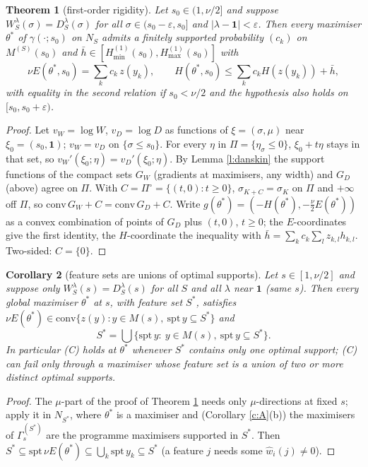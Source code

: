 \documentclass[11pt]{article}
\newtheorem{theorem}{Theorem}\newtheorem{lemma}[theorem]{Lemma}\newtheorem{proposition}[theorem]{Proposition}
\newtheorem{corollary}[theorem]{Corollary}
\theoremstyle{remark}\newtheorem{remark}[theorem]{Remark}
\begin{document}
\begin{theorem}[first-order rigidity]\label{t:B}
Let $s_0\in(1,\nu/2]$ and suppose $W^\lambda_S(\sigma)=D^\lambda_S(\sigma)$ for all $\sigma\in(s_0-\varepsilon,s_0]$ and
$|\lambda-\mathbf1|<\varepsilon$. Then every maximiser $\theta^*$ of $\gamma(\cdot;s_0)$ on $N_S$ admits a finitely supported
probability $(c_k)$ on $M^{(S)}(s_0)$ and $\bar h\in[H^{(1)}_{\min}(s_0),H^{(1)}_{\max}(s_0)]$ with
\[\nu E(\theta^*,s_0)=\sum_kc_k\,z(y_k),\qquad H(\theta^*,s_0)\le\sum_kc_kH(z(y_k))+\bar h ,\]
with equality in the second relation if $s_0<\nu/2$ and the hypothesis also holds on $[s_0,s_0+\varepsilon)$.
\end{theorem}
\begin{proof}
Let $v_W=\log W$, $v_D=\log D$ as functions of $\xi=(\sigma,\mu)$ near $\xi_0=(s_0,\mathbf1)$; $v_W=v_D$ on $\{\sigma\le s_0\}$.
For every $\eta$ in $\Pi=\{\eta_\sigma\le0\}$, $\xi_0+t\eta$ stays in that set, so $v_W'(\xi_0;\eta)=v_D'(\xi_0;\eta)$. By
Lemma \ref{l:danskin} the support functions of the compact sets $G_W$ (gradients at maximisers, any width) and $G_D$ (above)
agree on $\Pi$. With $C=\Pi^\circ=\{(t,0):t\ge0\}$, $\sigma_{K+C}=\sigma_K$ on $\Pi$ and $+\infty$ off $\Pi$, so
$\mathrm{conv}\,G_W+C=\mathrm{conv}\,G_D+C$. Write $g(\theta^*)=(-H(\theta^*),-\frac\nu2E(\theta^*))$ as a convex combination
of points of $G_D$ plus $(t,0)$, $t\ge0$; the $E$-coordinates give the first identity, the $H$-coordinate the inequality
with $\bar h=\sum_kc_k\sum_lz_{k,l}h_{k,l}$. Two-sided: $C=\{0\}$.
\end{proof}

\begin{corollary}[feature sets are unions of optimal supports]\label{c:union}
Let $s\in[1,\nu/2]$ and suppose only $W^\lambda_S(s)=D^\lambda_S(s)$ for all $S$ and all $\lambda$ near $\mathbf1$ (same $s$).
Then every global maximiser $\theta^*$ at $s$, with feature set $S^*$, satisfies
$\nu E(\theta^*)\in\mathrm{conv}\{z(y):y\in M(s),\ \mathrm{spt}\,y\subseteq S^*\}$ and
\[S^*=\bigcup\{\mathrm{spt}\,y:\ y\in M(s),\ \mathrm{spt}\,y\subseteq S^*\}.\]
In particular (C) holds at $\theta^*$ whenever $S^*$ contains only one optimal support; (C) can fail only through a maximiser whose
feature set is a union of two or more distinct optimal supports.
\end{corollary}
\begin{proof}
The $\mu$-part of the proof of Theorem \ref{t:B} needs only $\mu$-directions at fixed $s$; apply it in $N_{S^*}$, where $\theta^*$ is a
maximiser and (Corollary \ref{c:A}(b)) the maximisers of $\Gamma^{(S^*)}_s$ are the programme maximisers supported in $S^*$. Then
$S^*\subseteq\mathrm{spt}\,\nu E(\theta^*)\subseteq\bigcup_k\mathrm{spt}\,y_k\subseteq S^*$ (a feature $j$ needs some $\hat w_i(j)\ne0$).
\end{proof}
\end{document}
